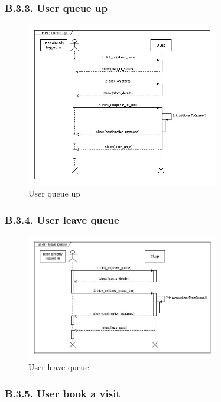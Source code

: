 \subsubsection{B.3.3. User queue up}

\begin{figure}[H]
\centering
\includegraphics[width=0.75\textwidth]{sequence_diagrams/sequence_diagram_user_queue_up}
\caption{User queue up}
\end{figure}

\subsubsection{B.3.4. User leave queue}

\begin{figure}[H]
\centering
\includegraphics[width=0.75\textwidth]{sequence_diagrams/sequence_diagram_user_leave_queue}
\caption{User leave queue}
\end{figure}

\subsubsection{B.3.5. User book a visit}

